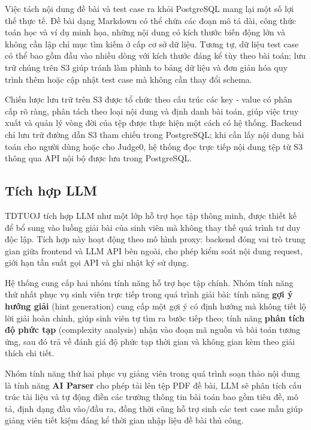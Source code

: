 \documentclass[12pt, a4paper]{report}
\begin{document}
Việc tách nội dung đề bài và test case ra khỏi PostgreSQL mang lại một số lợi thế thực tế.
Đề bài dạng Markdown có thể chứa các đoạn mô tả dài, công thức toán học và ví dụ minh họa, những nội dung có kích thước biến động lớn và không cần lập chỉ mục tìm kiếm ở cấp cơ
sở dữ liệu. Tương tự, dữ liệu test case có thể bao gồm đầu vào nhiều dòng với kích thước
đáng kể tùy theo bài toán; lưu trữ chúng trên S3 giúp tránh làm phình to bảng dữ liệu và
đơn giản hóa quy trình thêm hoặc cập nhật test case mà không cần thay đổi schema.

Chiến lược lưu trữ trên S3 được tổ chức theo cấu trúc các key - value có phân cấp rõ ràng, phân tách
theo loại nội dung và định danh bài toán, giúp việc truy xuất và quản lý vòng đời của tệp
được thực hiện một cách có hệ thống. Backend chỉ lưu trữ đường dẫn S3 tham chiếu trong
PostgreSQL; khi cần lấy nội dung bài toán cho người dùng hoặc cho Judge0, hệ thống đọc trực
tiếp nội dung tệp từ S3 thông qua \ac{API} nội bộ được lưu trong PostgreSQL.

\subsection{Tích hợp LLM}

TDTUOJ tích hợp \ac{LLM} như một lớp hỗ trợ học tập thông minh, được thiết kế để bổ sung
vào luồng giải bài của sinh viên mà không thay thế quá trình tư duy độc lập. Tích hợp này
hoạt động theo mô hình proxy: backend đóng vai trò trung gian giữa frontend và \ac{LLM}
API bên ngoài, cho phép kiểm soát nội dung request, giới hạn tần suất gọi API và ghi nhật ký
sử dụng.

Hệ thống cung cấp hai nhóm tính năng hỗ trợ học tập chính. Nhóm tính năng thứ nhất phục vụ
sinh viên trực tiếp trong quá trình giải bài: tính năng \textbf{gợi ý hướng giải} (hint
generation) cung cấp một gợi ý có định hướng mà không tiết lộ lời giải hoàn chỉnh, giúp
sinh viên tự tìm ra bước tiếp theo; tính năng \textbf{phân tích độ phức tạp} (complexity
analysis) nhận vào đoạn mã nguồn và bài toán tương ứng, sau đó trả về đánh giá độ phức tạp
thời gian và không gian kèm theo giải thích chi tiết. 

Nhóm tính năng thứ hai phục vụ giảng viên trong quá trình soạn thảo nội dung là tính 
năng \textbf{AI Parser} cho phép tải lên tệp \ac{PDF} đề bài, \ac{LLM} sẽ phân tích cấu trúc tài liệu 
và tự động điền các trường thông tin bài toán bao gồm tiêu đề, mô tả, định dạng đầu vào/đầu ra, đồng thời 
cũng hỗ trợ sinh các test case mẫu giúp giảng viên tiết kiệm đáng kể thời gian nhập liệu đề bài thủ công.
\end{document}
